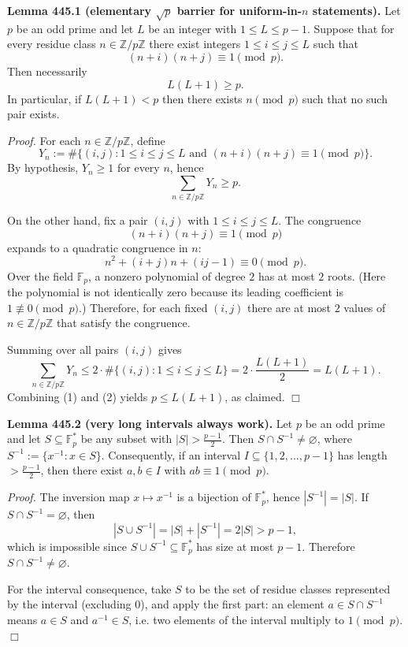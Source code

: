 \medskip
\noindent\textbf{Lemma 445.1 (elementary $\sqrt p$ barrier for uniform-in-$n$ statements).}
Let $p$ be an odd prime and let $L$ be an integer with $1\le L\le p-1$. Suppose that for every residue class $n\in\mathbb Z/p\mathbb Z$ there exist integers $1\le i\le j\le L$ such that
\[
(n+i)(n+j)\equiv 1\pmod p.
\]
Then necessarily
\[
L(L+1)\ge p.
\]
In particular, if $L(L+1)<p$ then there exists $n\pmod p$ such that no such pair exists.

\noindent\emph{Proof.}
For each $n\in\mathbb Z/p\mathbb Z$, define
\[
Y_n := \#\bigl\{(i,j): 1\le i\le j\le L\text{ and }(n+i)(n+j)\equiv 1\pmod p\bigr\}.
\]
By hypothesis, $Y_n\ge 1$ for every $n$, hence
\begin{equation}
\sum_{n\in\mathbb Z/p\mathbb Z} Y_n \ge p. \tag{1}
\end{equation}

On the other hand, fix a pair $(i,j)$ with $1\le i\le j\le L$. The congruence
\[(n+i)(n+j)\equiv 1\pmod p\]
expands to a quadratic congruence in $n$:
\[n^2 + (i+j)n + (ij-1)\equiv 0\pmod p.
\]
Over the field $\mathbb F_p$, a nonzero polynomial of degree $2$ has at most $2$ roots. (Here the polynomial is not identically zero because its leading coefficient is $1\not\equiv 0\pmod p$.) Therefore, for each fixed $(i,j)$ there are at most $2$ values of $n\in\mathbb Z/p\mathbb Z$ that satisfy the congruence.

Summing over all pairs $(i,j)$ gives
\[
\sum_{n\in\mathbb Z/p\mathbb Z} Y_n
\le 2\cdot \#\{(i,j): 1\le i\le j\le L\}
=2\cdot \frac{L(L+1)}{2}=L(L+1). \tag{2}
\]
Combining (1) and (2) yields $p\le L(L+1)$, as claimed. \hfill$\Box$

\medskip
\noindent\textbf{Lemma 445.2 (very long intervals always work).}
Let $p$ be an odd prime and let $S\subseteq\mathbb F_p^*$ be any subset with $|S|>\tfrac{p-1}{2}$. Then $S\cap S^{-1}\ne\varnothing$, where $S^{-1}:=\{x^{-1}:x\in S\}$.
Consequently, if an interval $I\subseteq\{1,2,\dots,p-1\}$ has length $>\tfrac{p-1}{2}$, then there exist $a,b\in I$ with $ab\equiv 1\pmod p$.

\noindent\emph{Proof.}
The inversion map $x\mapsto x^{-1}$ is a bijection of $\mathbb F_p^*$, hence $|S^{-1}|=|S|$.
If $S\cap S^{-1}=\varnothing$, then
\[|S\cup S^{-1}| = |S|+|S^{-1}| = 2|S| > p-1,
\]
which is impossible since $S\cup S^{-1}\subseteq\mathbb F_p^*$ has size at most $p-1$.
Therefore $S\cap S^{-1}\ne\varnothing$.

For the interval consequence, take $S$ to be the set of residue classes represented by the interval (excluding $0$), and apply the first part: an element $a\in S\cap S^{-1}$ means $a\in S$ and $a^{-1}\in S$, i.e. two elements of the interval multiply to $1\pmod p$. \hfill$\Box$

